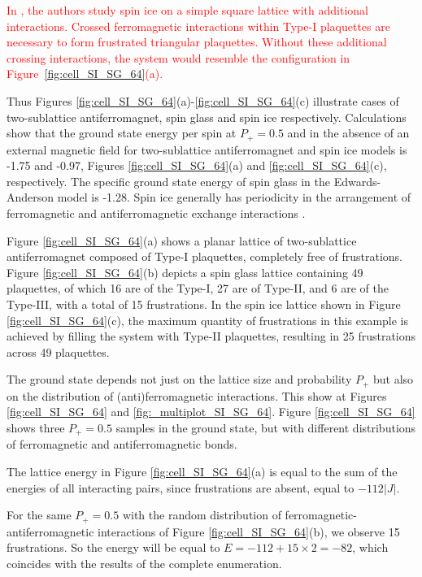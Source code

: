 \documentclass[preprint,12pt]{elsarticle}
\begin{document}
	\textcolor{red}{In \cite{grigera2018entropy}, the authors study spin ice on a simple square lattice with additional interactions. Crossed ferromagnetic interactions within Type-I plaquettes are necessary to form frustrated triangular plaquettes. Without these additional crossing interactions, the system would resemble the configuration in Figure~\ref{fig:cell_SI_SG_64}(a).}

	Thus Figures \ref{fig:cell_SI_SG_64}(a)-\ref{fig:cell_SI_SG_64}(c) illustrate cases of two-sublattice antiferromagnet, spin glass and spin ice respectively. Calculations show that the ground state energy per spin at $P_+ = 0.5$ and in the absence of an external magnetic field for two-sublattice antiferromagnet and spin ice models is -1.75 and -0.97, Figures \ref{fig:cell_SI_SG_64}(a) and \ref{fig:cell_SI_SG_64}(c), respectively. The specific ground state energy of spin glass in the Edwards-Anderson model is -1.28. Spin ice generally has periodicity in the arrangement of ferromagnetic and antiferromagnetic exchange interactions \cite{andriushchenko2019large, peretyatko2017interplay, otsuka2018husimi,  shevchenko2017effect, kato2022flux}.
	
	Figure \ref{fig:cell_SI_SG_64}(a) shows a planar lattice of two-sublattice antiferromagnet composed of Type-I plaquettes, completely free of frustrations.
	Figure \ref{fig:cell_SI_SG_64}(b) depicts a spin glass lattice containing 49 plaquettes, of which 16 are of the Type-I, 27 are of Type-II, and 6 are of the Type-III, with a total of 15 frustrations.
	In the spin ice lattice shown in Figure \ref{fig:cell_SI_SG_64}(c), the maximum quantity of frustrations in this example is achieved by filling the system with Type-II plaquettes, resulting in 25 frustrations across 49 plaquettes.
	
	The ground state depends not just on the lattice size and probability $P_+$ but also on the distribution of (anti)ferromagnetic interactions. This show at Figures \ref{fig:cell_SI_SG_64} and \ref{fig:_multiplot_SI_SG_64}. Figure \ref{fig:cell_SI_SG_64} shows three $P_+ = 0.5$ samples in the ground state, but with different distributions of ferromagnetic and antiferromagnetic bonds.
	
	The lattice energy in Figure \ref{fig:cell_SI_SG_64}(a) is equal to the sum of the energies of all interacting pairs, since frustrations are absent, equal to $-112|J|$.
	
	For the same $P_+ = 0.5$ with the random distribution of ferromagnetic-antiferromagnetic interactions of Figure \ref{fig:cell_SI_SG_64}(b), we observe 15 frustrations. So the energy will be equal to $E = -112 + 15\times2 = -82$, which coincides with the results of the complete enumeration.
	
\end{document}
